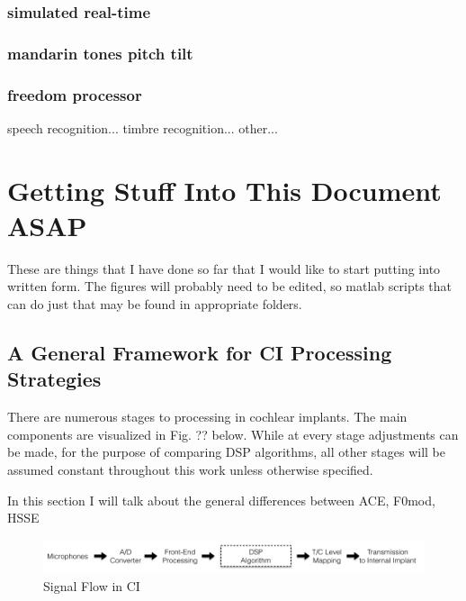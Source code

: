 \documentclass [11pt, proquest] {uwthesis}[2015/03/03]
\begin{document}
	\subsection{simulated real-time}
	
	\subsection{mandarin tones pitch tilt}
	
	\subsection{freedom processor}
		speech recognition...
		timbre recognition...
		other...









 


\chapter{Getting Stuff Into This Document ASAP}

These are things that I have done so far that I would like to start putting into written form.  The figures will probably need to be edited, so matlab scripts that can do just that may be found in appropriate folders.

\section{A General Framework for CI Processing Strategies}

There are numerous stages to processing in cochlear implants.  The main components are visualized in Fig. ?? below.  While at every stage adjustments can be made, for the purpose of comparing DSP algorithms, all other stages will be assumed constant throughout this work unless otherwise specified.

In this section I will talk about the general differences between ACE, F0mod, HSSE

\begin{figure}[!ht]
  \centering
    \includegraphics[width=1.0\textwidth]{CI_Signal_FlowTEMP}   
    \caption{Signal Flow in CI}
\end{figure}
\end{document}
